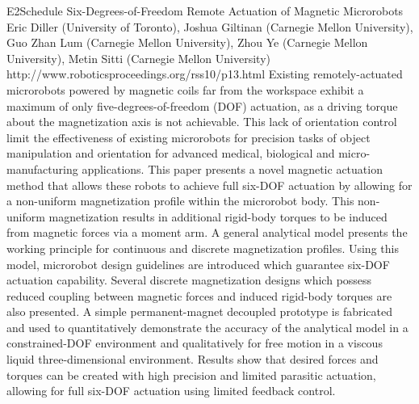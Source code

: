 \begin{spacing}{1.0}
\descriptionPaper
{E2}{Schedule}
{	
Six-Degrees-of-Freedom Remote Actuation of Magnetic Microrobots
}
{
Eric Diller (University of Toronto), Joshua Giltinan (Carnegie Mellon University), Guo Zhan Lum (Carnegie Mellon University), Zhou Ye (Carnegie Mellon University), Metin Sitti (Carnegie Mellon University)
}
{
http://www.roboticsproceedings.org/rss10/p13.html
}
{
Existing remotely-actuated microrobots powered by magnetic coils far from the workspace exhibit a maximum of only five-degrees-of-freedom (DOF) actuation, as a driving torque about the magnetization axis is not achievable. This lack of orientation control limit the effectiveness of existing microrobots for precision tasks of object manipulation and orientation for advanced medical, biological and micro-manufacturing applications. This paper presents a novel magnetic actuation method that allows these robots to achieve full six-DOF actuation by allowing for a non-uniform magnetization profile within the microrobot body. This non-uniform magnetization results in additional rigid-body torques to be induced from magnetic forces via a moment arm. A general analytical model presents the working principle for continuous and discrete magnetization profiles. Using this model, microrobot design guidelines are introduced which guarantee six-DOF actuation capability. Several discrete magnetization designs which possess reduced coupling between magnetic forces and induced rigid-body torques are also presented. A simple permanent-magnet decoupled prototype is fabricated and used to quantitatively demonstrate the accuracy of the analytical model in a constrained-DOF environment and qualitatively for free motion in a viscous liquid three-dimensional environment. Results show that desired forces and torques can be created with high precision and limited parasitic actuation, allowing for full six-DOF actuation using limited feedback control.
}





\end{spacing}
